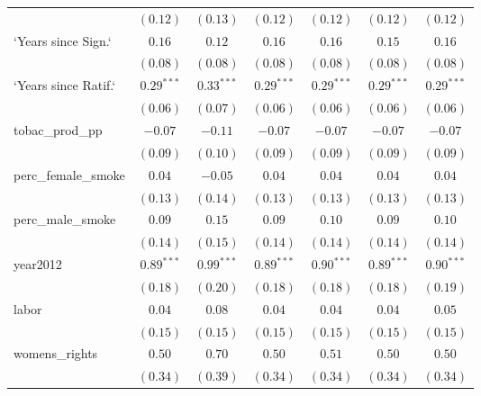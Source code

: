 \begin{table}[!h]
\begin{center}
\begin{tabular}{l c c c c c c }
                        & $(0.12)$     & $(0.13)$      & $(0.12)$     & $(0.12)$     & $(0.12)$     & $(0.12)$     \\
`Years since Sign.`     & $0.16$       & $0.12$        & $0.16$       & $0.16$       & $0.15$       & $0.16$       \\
                        & $(0.08)$     & $(0.08)$      & $(0.08)$     & $(0.08)$     & $(0.08)$     & $(0.08)$     \\
`Years since Ratif.`    & $0.29^{***}$ & $0.33^{***}$  & $0.29^{***}$ & $0.29^{***}$ & $0.29^{***}$ & $0.29^{***}$ \\
                        & $(0.06)$     & $(0.07)$      & $(0.06)$     & $(0.06)$     & $(0.06)$     & $(0.06)$     \\
tobac\_prod\_pp         & $-0.07$      & $-0.11$       & $-0.07$      & $-0.07$      & $-0.07$      & $-0.07$      \\
                        & $(0.09)$     & $(0.10)$      & $(0.09)$     & $(0.09)$     & $(0.09)$     & $(0.09)$     \\
perc\_female\_smoke     & $0.04$       & $-0.05$       & $0.04$       & $0.04$       & $0.04$       & $0.04$       \\
                        & $(0.13)$     & $(0.14)$      & $(0.13)$     & $(0.13)$     & $(0.13)$     & $(0.13)$     \\
perc\_male\_smoke       & $0.09$       & $0.15$        & $0.09$       & $0.10$       & $0.09$       & $0.10$       \\
                        & $(0.14)$     & $(0.15)$      & $(0.14)$     & $(0.14)$     & $(0.14)$     & $(0.14)$     \\
year2012                & $0.89^{***}$ & $0.99^{***}$  & $0.89^{***}$ & $0.90^{***}$ & $0.89^{***}$ & $0.90^{***}$ \\
                        & $(0.18)$     & $(0.20)$      & $(0.18)$     & $(0.18)$     & $(0.18)$     & $(0.19)$     \\
labor                   & $0.04$       & $0.08$        & $0.04$       & $0.04$       & $0.04$       & $0.05$       \\
                        & $(0.15)$     & $(0.15)$      & $(0.15)$     & $(0.15)$     & $(0.15)$     & $(0.15)$     \\
womens\_rights          & $0.50$       & $0.70$        & $0.50$       & $0.51$       & $0.50$       & $0.50$       \\
                        & $(0.34)$     & $(0.39)$      & $(0.34)$     & $(0.34)$     & $(0.34)$     & $(0.34)$     \\

\end{tabular}
\end{center}
\end{table}
